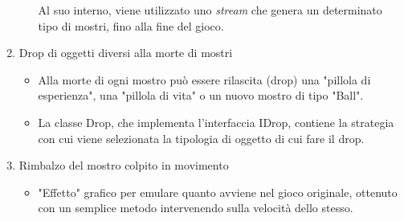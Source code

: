 \documentclass[a4paper,12pt]{report}
\begin{document}
\begin{enumerate}
\begin{itemize}
	Al suo interno, viene utilizzato uno \emph{stream} che genera un determinato tipo di mostri, fino alla fine del gioco. 
\end{itemize}
%
\item Drop di oggetti diversi alla morte di mostri
%
\begin{itemize}
	\item Alla morte di ogni mostro può essere rilascita (drop) una "pillola di esperienza", una "pillola di vita" o un nuovo mostro di tipo "Ball".
	\item La classe Drop, che implementa l'interfaccia IDrop, contiene la strategia con cui viene selezionata la tipologia di oggetto di cui fare il drop.
\end{itemize}

\item Rimbalzo del mostro colpito in movimento
%
\begin{itemize}
	\item "Effetto" grafico per emulare quanto avviene nel gioco originale, ottenuto con un semplice metodo intervenendo sulla velocità dello stesso.
\end{itemize}

\end{enumerate}
%
\end{document}
